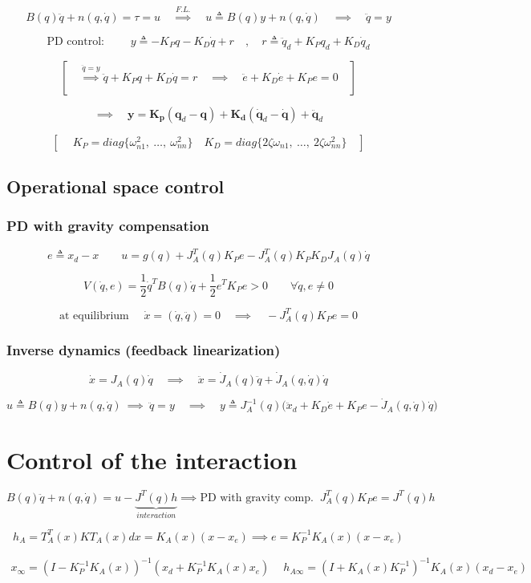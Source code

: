 $$
B(q)\ddot{q} + n(q, \dot{q}) = \tau = u
\quad
\overset{F.L.}{\implies}
\quad
u \triangleq B(q)y + n(q, \dot{q})
\quad
\implies
\quad
\ddot{q} = y
$$

$$
\text{PD control: } \qquad
y \triangleq -K_P q - K_D \dot{q} + r
\quad , \quad
r \triangleq \ddot{q}_d + K_P q_d + K_D \dot{q}_d
$$

$$
\left[
\quad
\overset{\ddot{q} = y}{\implies}
\ddot{q} + K_P q + K_D \dot{q} = r
\quad \implies \quad
\ddot{e} + K_D \dot{e} + K_P e = 0
\quad
\right]
$$

$$
\implies \quad
\bm{y} = \bm{K_p}(\bm{q}_d - \bm{q}) + \bm{K_d}(\dot{\bm{q}}_d - \dot{\bm{q}}) + \ddot{\bm{q}}_d
$$

$$
\left[
\ 
\quad 
K_P = diag\{\omega_{n1}^2, \ \dots, \ \omega_{nn}^2\}
\quad
K_D = diag\{2\zeta\omega_{n1}, \ \dots, \ 2\zeta\omega_{nn}^2\}
\quad
\right]
$$




\subsection{Operational space control}

\subsubsection{PD with gravity compensation}

$$
e \triangleq x_d - x
\qquad 
u = g(q) + J_A^T(q)K_P e - J_A^T(q)K_P K_D J_A(q)\dot{q}
$$

$$
V(\dot{q}, e) = \frac{1}{2}\dot{q}^TB(q)\dot{q} + \frac{1}{2}e^TK_Pe > 0 \qquad \forall \dot{q},e \neq 0
$$

$$
\text{at equilibrium } \quad \dot{x} = (\dot{q}, \ddot{q}) = 0
\quad \implies \quad
-J_A^T(q)K_P e = 0
$$


\subsubsection{Inverse dynamics (feedback linearization)}
$$
\dot{x} = J_A(q)\dot{q} \quad \implies \quad \ddot{x} = \dot{J}_A(q)\ddot{q} + \dot{J}_A(q, \dot{q})\dot{q}
$$

$$
u \triangleq B(q)y + n(q, \dot{q})
\ \implies \
\ddot{q} = y
\quad \implies \quad
y \triangleq J_{A}^{-1}(q)\bigl(\ddot{x}_{d}+K_{D}\dot{e}+K_{P}e-\dot{J}_{A}(q,\dot{q})\dot{q}\bigr)
$$



\section{Control of the interaction}
$$
B(q)\ddot{q} + n(q, \dot{q}) = u - \underbrace{J^T(q) h}_{interaction}
\implies
\text{PD with gravity comp. } \ 
J_A^T(q)K_P e = J^T(q) h
$$

$$
h_A = T_A^T(x) K T_A(x) dx = K_A(x)(x-x_e)
\implies
e = K_P^{-1} K_A(x) (x-x_e)
$$

\begin{gather*}
x_\infty = (I - K_P^{-1}K_A(x))^{-1}(x_d + K_P^{-1}K_A(x)x_e)
\  \quad
h_{A \infty} = (I+ K_A(x)K_P^{-1})^{-1}K_A(x)(x_d-x_e)
\end{gather*}
